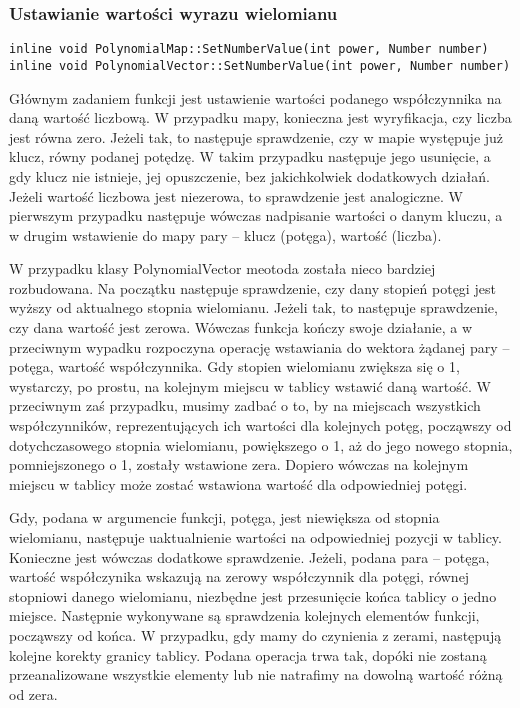 \documentclass[twoside,a4paper]{book}
\begin{document}
\subsubsection{Ustawianie wartości wyrazu wielomianu}
\begin{lstlisting}
inline void PolynomialMap::SetNumberValue(int power, Number number)
inline void PolynomialVector::SetNumberValue(int power, Number number)
\end{lstlisting}

Głównym zadaniem funkcji jest ustawienie wartości podanego współczynnika na daną wartość liczbową. W przypadku mapy, konieczna jest wyryfikacja, czy liczba jest równa zero. Jeżeli tak, to następuje sprawdzenie, czy w mapie występuje już klucz, równy podanej potędzę. W takim przypadku następuje jego usunięcie, a gdy klucz nie istnieje, jej opuszczenie, bez jakichkolwiek dodatkowych działań. Jeżeli wartość liczbowa jest niezerowa, to sprawdzenie jest analogiczne. W pierwszym przypadku następuje wówczas nadpisanie wartości o danym kluczu, a w drugim wstawienie do mapy pary – klucz (potęga), wartość (liczba).

W przypadku klasy PolynomialVector meotoda została nieco bardziej rozbudowana. Na początku następuje sprawdzenie, czy dany stopień potęgi jest wyższy od aktualnego stopnia wielomianu. Jeżeli tak, to następuje sprawdzenie, czy dana wartość jest zerowa. Wówczas funkcja kończy swoje działanie, a w przeciwnym wypadku rozpoczyna operację wstawiania do wektora żądanej pary – potęga, wartość współczynnika. Gdy stopien wielomianu zwiększa się o 1, wystarczy, po prostu, na kolejnym miejscu w tablicy wstawić daną wartość. W przeciwnym zaś przypadku, musimy zadbać o to, by na miejscach wszystkich współczynników, reprezentujących ich wartości dla kolejnych potęg, począwszy od dotychczasowego stopnia wielomianu, powiększego o 1, aż do jego nowego stopnia, pomniejszonego o 1, zostały wstawione zera. Dopiero wówczas na kolejnym miejscu w tablicy może zostać wstawiona wartość dla odpowiedniej potęgi.

Gdy, podana w argumencie funkcji, potęga, jest niewiększa od stopnia wielomianu, następuje uaktualnienie wartości na odpowiedniej pozycji w tablicy. Konieczne jest wówczas dodatkowe sprawdzenie. Jeżeli, podana para – potęga, wartość współczynika wskazują na zerowy współczynnik dla potęgi, równej stopniowi danego wielomianu, niezbędne jest przesunięcie końca tablicy o jedno miejsce. Następnie wykonywane są sprawdzenia kolejnych elementów funkcji, począwszy od końca. W przypadku, gdy mamy do czynienia z zerami, następują kolejne korekty granicy tablicy. Podana operacja trwa tak, dopóki nie zostaną przeanalizowane wszystkie elementy lub nie natrafimy na dowolną wartość różną od zera.
\end{document}
